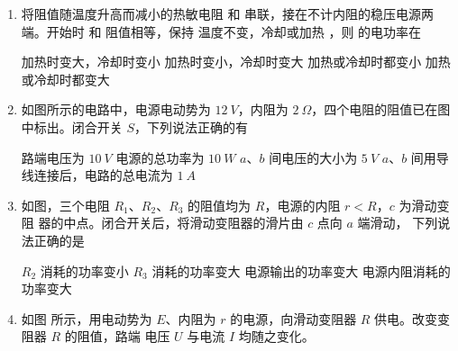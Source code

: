 \begin{enumerate}
\item
{}
将阻值随温度升高而减小的热敏电阻  和  串联，接在不计内阻的稳压电源两端。开始时  和  
阻值相等，保持  温度不变，冷却或加热  ，则  的电功率在  

\fourchoices
{加热时变大，冷却时变小}
{加热时变小，冷却时变大}
{加热或冷却时都变小}
{加热或冷却时都变大}



\item 
{}
如图所示的电路中，电源电动势为 $ 12 \ V $，内阻为 $ 2 \ \Omega $，四个电阻的阻值已在图
中标出。闭合开关 $ S $，下列说法正确的有  
\begin{figure}[h!]
\centering

\end{figure}

\fourchoices
{路端电压为 $ 10 \ V $}
{电源的总功率为 $ 10 \ W $}
{$ a $、$ b $ 间电压的大小为 $ 5 \ V $}
{$ a $、$ b $ 间用导线连接后，电路的总电流为 $ 1 \ A $}


\item 
{}
如图，三个电阻 $ R_{1} $、$ R_{2} $、$ R_{3} $ 的阻值均为 $ R $，电源的内阻 $ r<R $，$ c $ 为滑动变阻
器的中点。闭合开关后，将滑动变阻器的滑片由 $ c $ 点向 $ a $ 端滑动，
下列说法正确的是  
\begin{figure}[h!]
\centering

\end{figure}

\fourchoices
{$ R_{2} $ 消耗的功率变小}
{$ R_{3} $ 消耗的功率变大}
{电源输出的功率变大}
{电源内阻消耗的功率变大}



\item 
{}
如图  所示，用电动势为 $ E $、内阻为 $ r $ 的电源，向滑动变阻器 $ R $ 供电。改变变阻器 $ R $ 的阻值，路端
电压 $ U $ 与电流 $ I $ 均随之变化。
\begin{figure}[h!]
\centering
\begin{subfigure}{0.4\linewidth}
\centering
 
\caption{}\label{2018BeiJin01}
\end{subfigure}
\begin{subfigure}{0.4\linewidth}
\centering
 
\caption{}\label{2018BeiJin02}
\end{subfigure}
\end{figure}


\end{enumerate}
